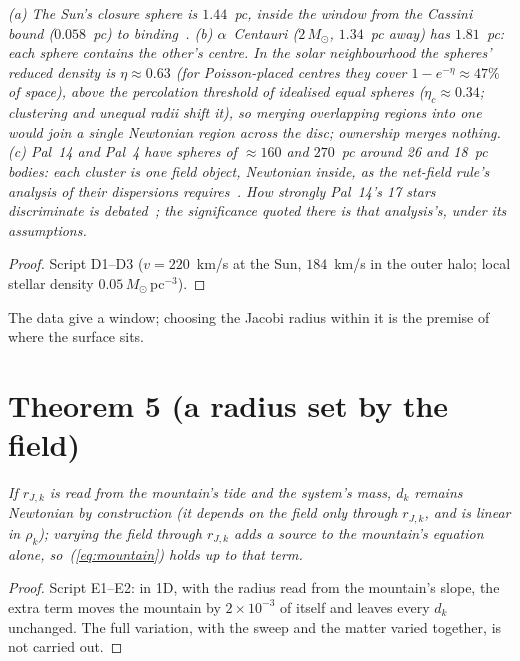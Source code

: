 \documentclass[twocolumn]{iopjournal}
\begin{document}
\emph{(a) The Sun's closure sphere is $1.44$~pc, inside the window from
the Cassini bound ($0.058$~pc) to binding~\cite{NelsonNFR}. (b)
$\alpha$~Centauri ($2\,M_\odot$, $1.34$~pc away) has $1.81$~pc: each
sphere contains the other's centre. In the solar neighbourhood the
spheres' reduced density is $\eta \approx 0.63$ (for Poisson-placed
centres they cover $1 - e^{-\eta} \approx 47\%$ of space), above the
percolation threshold of idealised equal spheres ($\eta_c \approx 0.34$;
clustering and unequal radii shift it), so merging
overlapping regions into one would join a single Newtonian region
across the disc; ownership merges nothing. (c) Pal~14 and Pal~4 have
spheres of $\approx160$ and $270$~pc around 26 and 18~pc bodies: each
cluster is one field object, Newtonian inside, as the net-field rule's
analysis of their dispersions requires~\cite{NelsonNFR}. How strongly
Pal~14's 17 stars discriminate is debated~\cite{Jordi2009,
Gentile2010,Sollima2012}; the significance quoted there is that
analysis's, under its assumptions.}

\begin{proof}
Script D1--D3 ($v = 220$~km/s at the Sun, $184$~km/s in the outer
halo; local stellar density $0.05\,M_\odot$\,pc$^{-3}$).
\end{proof}

The data give a window; choosing the Jacobi radius within it is the
premise of where the surface sits.


\section*{Theorem 5 (a radius set by the field)}

\emph{If $r_{J,k}$ is read from the mountain's tide and the system's
mass, $d_k$ remains Newtonian by construction (it depends on the
field only through $r_{J,k}$, and is linear in $\rho_k$); varying the
field through $r_{J,k}$ adds a source to the mountain's equation alone,
so~(\ref{eq:mountain}) holds up to that term.}

\begin{proof}
Script E1--E2: in 1D, with the radius read from the mountain's slope,
the extra term moves the mountain by $2\times10^{-3}$ of itself and
leaves every $d_k$ unchanged. The full variation, with the sweep and
the matter varied together, is not carried out.
\end{proof}
\end{document}
